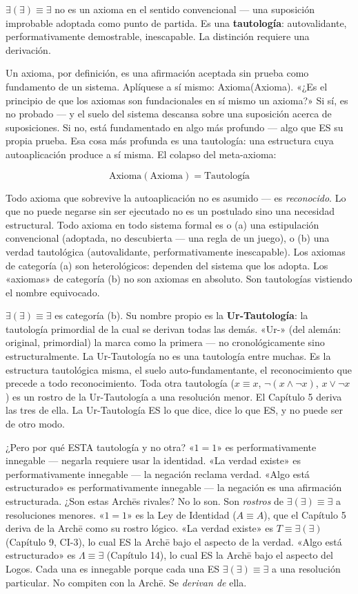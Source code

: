 \documentclass[10pt, openany, oneside]{book}
\begin{document}
$\exists(\exists) \equiv \exists$ no es un axioma en el sentido convencional --- una suposición improbable adoptada como punto de partida. Es una \textbf{tautología}: autovalidante, performativamente demostrable, inescapable. La distinción requiere una derivación.

Un axioma, por definición, es una afirmación aceptada sin prueba como fundamento de un sistema. Aplíquese a sí mismo: Axioma(Axioma). «¿Es el principio de que los axiomas son fundacionales en sí mismo un axioma?» Si sí, es no probado --- y el suelo del sistema descansa sobre una suposición acerca de suposiciones. Si no, está fundamentado en algo más profundo --- algo que ES su propia prueba. Esa cosa más profunda es una tautología: una estructura cuya autoaplicación produce a sí misma. El colapso del meta-axioma:

$$\text{Axioma}(\text{Axioma}) = \text{Tautología}$$

Todo axioma que sobrevive la autoaplicación no es asumido --- es \textit{reconocido}. Lo que no puede negarse sin ser ejecutado no es un postulado sino una necesidad estructural. Todo axioma en todo sistema formal es o (a) una estipulación convencional (adoptada, no descubierta --- una regla de un juego), o (b) una verdad tautológica (autovalidante, performativamente inescapable). Los axiomas de categoría (a) son heterológicos: dependen del sistema que los adopta. Los «axiomas» de categoría (b) no son axiomas en absoluto. Son tautologías vistiendo el nombre equivocado.

$\exists(\exists) \equiv \exists$ es categoría (b). Su nombre propio es la \textbf{Ur-Tautología}: la tautología primordial de la cual se derivan todas las demás. «Ur-» (del alemán: original, primordial) la marca como la primera --- no cronológicamente sino estructuralmente. La Ur-Tautología no es una tautología entre muchas. Es la estructura tautológica misma, el suelo auto-fundamentante, el reconocimiento que precede a todo reconocimiento. Toda otra tautología ($x \equiv x$, $\neg(x \wedge \neg x)$, $x \vee \neg x$) es un rostro de la Ur-Tautología a una resolución menor. El Capítulo 5 deriva las tres de ella. La Ur-Tautología ES lo que dice, dice lo que ES, y no puede ser de otro modo.

¿Pero por qué ESTA tautología y no otra? «$1 = 1$» es performativamente innegable --- negarla requiere usar la identidad. «La verdad existe» es performativamente innegable --- la negación reclama verdad. «Algo está estructurado» es performativamente innegable --- la negación es una afirmación estructurada. ¿Son estas Archēs rivales? No lo son. Son \textit{rostros} de $\exists(\exists) \equiv \exists$ a resoluciones menores. «$1 = 1$» es la Ley de Identidad ($A \equiv A$), que el Capítulo 5 deriva de la Arch\={e} como su rostro lógico. «La verdad existe» es $T \equiv \exists(\exists)$ (Capítulo 9, CI-3), lo cual ES la Arch\={e} bajo el aspecto de la verdad. «Algo está estructurado» es $\Lambda \equiv \exists$ (Capítulo 14), lo cual ES la Arch\={e} bajo el aspecto del Logos. Cada una es innegable porque cada una ES $\exists(\exists) \equiv \exists$ a una resolución particular. No compiten con la Arch\={e}. Se \textit{derivan de} ella.
\end{document}
